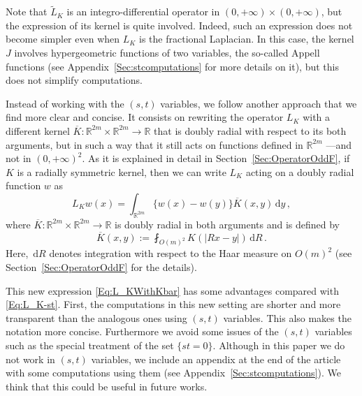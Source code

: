 \documentclass[12pt,reqno]{amsart}
\theoremstyle{definition}
\theoremstyle{remark}
\newcommand{\con}[1]{\mathbb{#1}}
\newcommand{\R}{\con{R}} %
\renewcommand{\d}{\,\mathrm{d}} %
\newcommand{\average}{\fint}
\numberwithin{equation}{section}
\begin{document}
	Note that $\widetilde{L}_K$ is an integro-differential operator in $(0,+\infty)\times(0,+\infty)$, but the expression of its kernel is quite involved. Indeed, such an expression does not become simpler even when $L_K$ is the fractional Laplacian. In this case, the kernel $J$ involves hypergeometric functions of two variables, the so-called Appell functions (see Appendix~\ref{Sec:stcomputations} for more details on it), but this does not simplify computations. 
	
	
	
	Instead of working with the $(s,t)$ variables, we follow another approach that we find more clear and concise. It consists on rewriting the operator $L_K$ with a different kernel $\overline{K} : \R^{2m}\times \R^{2m} \to \R$ that is doubly radial with respect to its both arguments, but in such a way that it still acts on functions defined in $\R^{2m}$ ---and not in $(0,+\infty)^2$. As it is explained in detail in Section~\ref{Sec:OperatorOddF}, if $K$ is a radially symmetric kernel, then we can write $L_K$ acting on a doubly radial function $w$ as
	\begin{equation}
	\label{Eq:L_KWithKbar}
	L_K w(x) = \int_{\R^{2m}} \{w(x) - w(y)\} \overline{K}(x,y) \d y\,,
	\end{equation}
	where $\overline{K} : \R^{2m}\times \R^{2m} \to \R$ is doubly radial in both arguments and is defined by
	\begin{equation}
	\label{Eq:KbarDef'}
	\overline{K}(x,y) := \average_{O(m)^2} K(|Rx - y|)\d R\,.
	\end{equation}
	Here, $\d R$ denotes integration with respect to the Haar measure on $O(m)^2$ (see Section~\ref{Sec:OperatorOddF} for the details).
	
	This new expression \eqref{Eq:L_KWithKbar} has some advantages compared with \eqref{Eq:L_K-st}. First, the computations in this new setting are shorter and more transparent than the analogous ones using $(s,t)$ variables. This also makes the notation more concise. Furthermore we avoid some issues of the $(s,t)$ variables such as the special treatment of the set $\{st=0\}$. Although in this paper we do not work in $(s,t)$ variables, we include an appendix at the end of the article with some computations using them (see Appendix~\ref{Sec:stcomputations}). We think that this could be useful in future works.  
	
\end{document}
